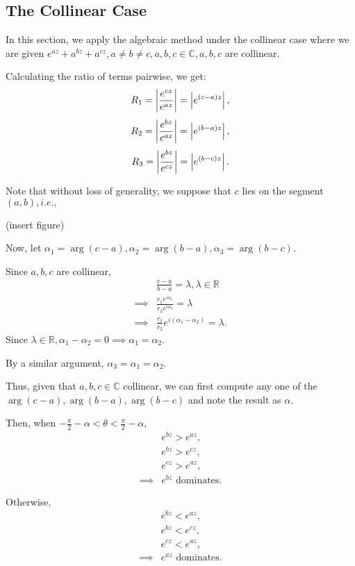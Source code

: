 \documentclass[11pt,reqno,oneside,a4paper]{article}
\begin{document}
\subsection{The Collinear Case}\label{subsec:algcol}

In this section, we apply the algebraic method under the collinear case where we are given $e^{az}+a^{bz} + a^{cz}, a\neq b \neq c, a,b,c \in \mathbb{C}, a,b,c$ are collinear. 

Calculating the ratio of terms pairwise, we get:
$$R_1 = \left\lvert\frac{e^{cz}}{e^{az}}\right\rvert = \left\lvert e^{(c-a)z}\right\rvert,$$
$$R_2 = \left\lvert\frac{e^{bz}}{e^{az}}\right\rvert = \left\lvert e^{(b-a)z}\right\rvert,$$
$$R_3 = \left\lvert\frac{e^{bz}}{e^{cz}}\right\rvert = \left\lvert e^{(b-c)z}\right\rvert.$$

Note that without loss of generality, we suppose that $c$ lies on the segment $(a,b), i.e.,$

(insert figure)

Now, let $\alpha_1 = \arg(c-a), \alpha_2 = \arg(b-a), \alpha_3 = \arg(b-c).$

Since $a,b,c$ are collinear,
\begin{align*}
&\frac{c-a}{b-a} = \lambda, \lambda \in \mathbb{R}\\
\implies &\frac{r_1 e^{i\alpha_1}}{r_2 e^{i\alpha_2}} = \lambda \\
\implies &\frac{r_1}{r_2} e^{i(\alpha_1 - \alpha_2)} = \lambda.
\end{align*}
Since $\lambda\in\mathbb{R}, \alpha_1 - \alpha_2 = 0 \implies \alpha_1 = \alpha_2.$

By a similar argument, $\alpha_3 = \alpha_1 = \alpha_2.$

Thus, given that $a,b,c\in \mathbb{C}$ collinear, we can first compute any one of the $\arg(c-a),\arg(b-a),\arg(b-c)$ and note the result as $\alpha.$

Then, when $-\frac{\pi}{2} -\alpha < \theta < \frac{\pi}{2} - \alpha$, 
\begin{align*}
&e^{bz} > e^{az}, \\
&e^{bz} > e^{cz}, \\
&e^{cz} > e^{az}, \\
\implies &e^{bz} \text{ dominates.}
\end{align*}

Otherwise, 
\begin{align*}
&e^{bz} < e^{az}, \\
&e^{bz} < e^{cz}, \\
&e^{cz} < e^{az}, \\
\implies &e^{az} \text{ dominates.}
\end{align*}
 
\end{document}
